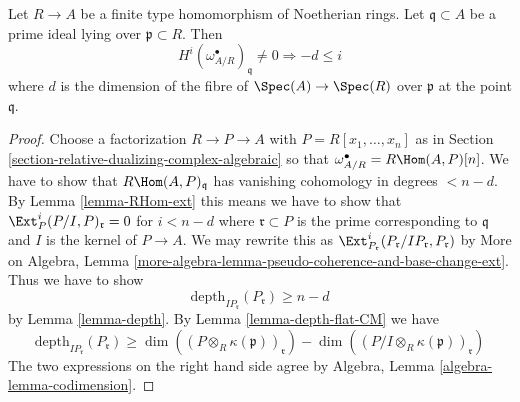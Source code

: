 \begin{lemma}
\label{lemma-relative-dualizing-trivial-vanishing}
Let $R \to A$ be a finite type homomorphism of Noetherian rings.
Let $\mathfrak q \subset A$ be a prime ideal lying over
$\mathfrak p \subset R$. Then
$$
H^i(\omega_{A/R}^\bullet)_\mathfrak q \not = 0
\Rightarrow - d \leq i
$$
where $d$ is the dimension of the fibre of $\Spec(A) \to \Spec(R)$
over $\mathfrak p$ at the point $\mathfrak q$.
\end{lemma}

\begin{proof}
Choose a factorization $R \to P \to A$ with $P = R[x_1, \ldots, x_n]$
as in Section \ref{section-relative-dualizing-complex-algebraic}
so that $\omega_{A/R}^\bullet = R\Hom(A, P)[n]$.
We have to show that $R\Hom(A, P)_\mathfrak q$
has vanishing cohomology in degrees $< n - d$.
By Lemma \ref{lemma-RHom-ext} this means we have to
show that $\Ext_P^i(P/I, P)_{\mathfrak r} = 0$ for $i < n - d$
where $\mathfrak r \subset P$ is the prime corresponding to $\mathfrak q$
and $I$ is the kernel of $P \to A$.
We may rewrite this as
$\Ext_{P_\mathfrak r}^i(P_\mathfrak r/IP_\mathfrak r, P_\mathfrak r)$
by More on Algebra, Lemma
\ref{more-algebra-lemma-pseudo-coherence-and-base-change-ext}.
Thus we have to show
$$
\text{depth}_{IP_\mathfrak r}(P_\mathfrak r) \geq n - d
$$
by Lemma \ref{lemma-depth}.
By Lemma \ref{lemma-depth-flat-CM} we have
$$
\text{depth}_{IP_\mathfrak r}(P_\mathfrak r) \geq
\dim((P \otimes_R \kappa(\mathfrak p))_\mathfrak r) -
\dim((P/I \otimes_R \kappa(\mathfrak p))_\mathfrak r)
$$
The two expressions on the right hand side agree by
Algebra, Lemma \ref{algebra-lemma-codimension}.
\end{proof}
